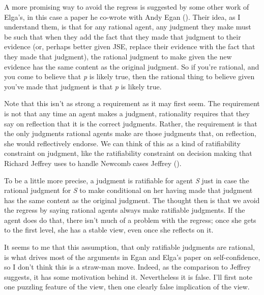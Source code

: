 \documentclass[
  10pt,
  letterpaper,
  DIV=11,
  numbers=noendperiod,
  twoside]{scrartcl}
\begin{document}
A more promising way to avoid the regress is suggested by some other
work of Elga's, in this case a paper he co-wrote with Andy Egan
(). Their idea, as I
understand them, is that for any rational agent, any judgment they make
must be such that when they add the fact that they made that judgment to
their evidence (or, perhaps better given JSE, replace their evidence
with the fact that they made that judgment), the rational judgment to
make given the new evidence has the same content as the original
judgment. So if you're rational, and you come to believe that \emph{p}
is likely true, then the rational thing to believe given you've made
that judgment is that \emph{p} is likely true.

Note that this isn't as strong a requirement as it may first seem. The
requirement is not that any time an agent makes a judgment, rationality
requires that they say on reflection that it is the correct judgments.
Rather, the requirement is that the only judgments rational agents make
are those judgments that, on reflection, she would reflectively endorse.
We can think of this as a kind of ratifiability constraint on judgment,
like the ratifiability constraint on decision making that Richard
Jeffrey uses to handle Newcomb cases Jeffrey
().

To be a little more precise, a judgment is ratifiable for agent \emph{S}
just in case the rational judgment for \emph{S} to make conditional on
her having made that judgment has the same content as the original
judgment. The thought then is that we avoid the regress by saying
rational agents always make ratifiable judgments. If the agent does do
that, there isn't much of a problem with the regress; once she gets to
the first level, she has a stable view, even once she reflects on it.

It seems to me that this assumption, that only ratifiable judgments are
rational, is what drives most of the arguments in Egan and Elga's paper
on self-confidence, so I don't think this is a straw-man move. Indeed,
as the comparison to Jeffrey suggests, it has some motivation behind it.
Nevertheless it is false. I'll first note one puzzling feature of the
view, then one clearly false implication of the view.
\end{document}
